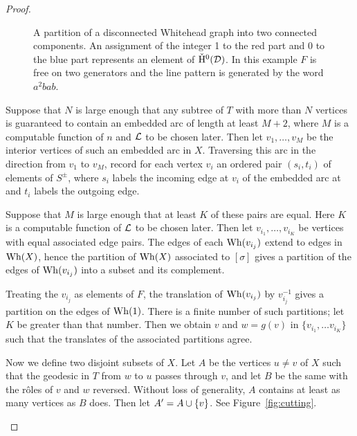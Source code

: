 \begin{proof}
\begin{figure}
\begin{tikzpicture}[scale=1]
\end{tikzpicture}
\caption{\label{fig:partition}
  A partition of a disconnected Whitehead graph into two connected components.
  An assignment of the integer 1 to the red part and 0 to the blue part represents an element of $\cH{}^0(\calD)$.
  In this example $F$ is free on two generators and the line pattern is generated by the word $a^2bab$.
}
\end{figure}

Suppose that $N$ is large enough that any subtree of $T$ with more than $N$ vertices is guaranteed to contain an embedded arc of length at least $M+2$, where $M$ is a computable function of $n$ and $\calL$ to be chosen later.
Then let $v_1, \ldots, v_M$ be the interior vertices of such an embedded arc in $X$.
Traversing this arc in the direction from $v_1$ to $v_M$, record for each vertex $v_i$ an ordered pair $(s_i, t_i)$ of elements of $S^\pm$, where $s_i$ labels the incoming edge at $v_i$ of the embedded arc at and $t_i$ labels the outgoing edge.

Suppose that $M$ is large enough that at least $K$ of these pairs are equal.
Here $K$ is a computable function of $\calL$ to be chosen later.
Then let $v_{i_1}, \ldots, v_{i_K}$ be vertices with equal associated edge pairs.
The edges of each $\Wh{v_{i_j}}$ extend to edges in $\Wh{X}$, hence the partition of $\Wh{X}$ associated to $[\sigma]$ gives a partition of the edges of $\Wh{v_{i_j}}$ into a subset and its complement.

Treating the $v_{i_j}$ as elements of $F$, the translation of $\Wh{v_{i_j}}$ by $v_{i_j}^{-1}$ gives a partition on the edges of $\Wh{1}$.
There is a finite number of such partitions; let $K$ be greater than that number.
Then we obtain $v$ and $w=g(v)$ in $\{v_{i_1}, \ldots v_{i_K}\}$ such that the translates of the associated partitions agree.

Now we define two disjoint subsets of $X$.
Let $A$ be the vertices $u \neq v$ of $X$ such that the geodesic in $T$ from $w$ to $u$ passes through $v$, and let $B$ be the same with the r\^oles of $v$ and $w$ reversed.
Without loss of generality, $A$ contains at least as many vertices as $B$ does.
Then let $A' = A \union \{v\}$.
See Figure~\ref{fig:cutting}.

\begin{figure}
\centering
{}
\end{figure}
\end{proof}
